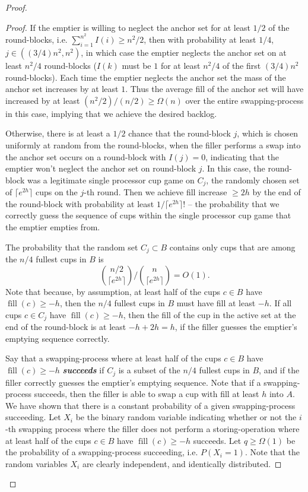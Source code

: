 \documentclass[twocolumn]{article}[10pt]
\newcommand{\defn}[1]{{\textit{\textbf{\boldmath #1}}}\xspace}
\DeclareMathOperator{\fil}{\text{fill}}
\begin{document}
\begin{proof}
{\begin{proof}
  If the emptier is willing to neglect the anchor set for at least $1/2$ of the
  round-blocks, i.e. $\sum_{i=1}^{n^2} I(i) \ge n^2 / 2$, then with probability
  at least $1/4$, $j \in ((3/4) n^2, n^2)$, in which case the emptier neglects
  the anchor set on at least $n^2/4$ round-blocks ($I(k)$ must be $1$ for at
  least $n^2/4$ of the first $(3/4)n^2$ round-blocks). Each time the emptier
  neglects the anchor set the mass of the anchor set increases by at least $1$.
  Thus the average fill of the anchor set will have increased by at least
  $(n^2/2)/(n/2) \ge \Omega(n)$ over the entire swapping-process in this
  case, implying that we achieve the desired backlog. 

  Otherwise, there is at least a $1/2$ chance that the round-block $j$, which
  is chosen uniformly at random from the round-blocks, when the filler performs
  a swap into the anchor set occurs on a round-block with $I(j)=0$, indicating
  that the emptier won't neglect the anchor set on round-block $j$. In this
  case, the round-block was a legitimate single processor cup game on $C_j$,
  the randomly chosen set of $\lceil e^{2h} \rceil$ cups on the $j$-th round.
  Then we achieve fill increase $\ge 2h$ by the end of the round-block with
  probability at least $1/\lceil e^{2h}\rceil!$ -- the probability that we
  correctly guess the sequence of cups within the single processor cup game
  that the emptier empties from. 

  The probability that the random set $C_j \subset B$ contains only cups that
  are among the $n/4$ fullest cups in $B$ is $${n/2 \choose {\lceil e^{2h}
  \rceil}} / {n \choose {\lceil e^{2h}\rceil}} = O(1).$$ Note that because, by
  assumption, at least half of the cups $c \in B$ have $\fil(c) \ge -h$, then
  the $n/4$ fullest cups in $B$ must have fill at least $-h$. If all cups $
  c\in C_j$ have $\fil(c) \ge -h$, then the fill of the cup in the active set
  at the end of the round-block is at least $-h + 2h = h$, if the filler
  guesses the emptier's emptying sequence correctly.

  Say that a swapping-process where at least half of the cups $c\in B$ have
  $\fil(c) \ge -h$ \defn{succeeds} if $C_j$ is a subset of the $n/4$ fullest
  cups in $B$, and if the filler correctly guesses the emptier's emptying
  sequence. Note that if a swapping-process succeeds, then the filler is able
  to swap a cup with fill at least $h$ into $A$. We have shown that there is a
  constant probability of a given swapping-process succeeding. Let $X_i$ be the
  binary random variable indicating whether or not the $i$-th swapping process
  where the filler does not perform a storing-operation where at least half of
  the cups $c\in B$ have $\fil(c) \ge -h$ succeeds. Let $q \ge \Omega(1)$ be
  the probability of a swapping-process succeeding, i.e. $P(X_i=1)$. Note that
  the random variables $X_i$ are clearly independent, and identically
  distributed.


\end{proof}}
\end{proof}
\end{document}
